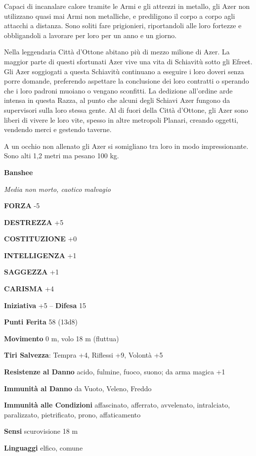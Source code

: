 \begin{multicols}{2}
	Capaci di incanalare calore tramite le Armi e gli attrezzi in metallo, gli Azer non utilizzano quasi mai Armi non metalliche, e prediligono il corpo a corpo agli attacchi a distanza. Sono soliti fare prigionieri, riportandoli alle loro fortezze e obbligandoli a lavorare per loro per un anno e un giorno.

	Nella leggendaria Città d'Ottone abitano più di mezzo milione di Azer. La maggior parte di questi sfortunati Azer vive una vita di Schiavitù sotto gli Efreet. Gli Azer soggiogati a questa Schiavitù continuano a eseguire i loro doveri senza porre domande, preferendo aspettare la conclusione dei loro contratti o sperando che i loro padroni muoiano o vengano sconfitti. La dedizione all'ordine arde intensa in questa Razza, al punto che alcuni degli Schiavi Azer fungono da supervisori sulla loro stessa gente. Al di fuori della Città d'Ottone, gli Azer sono liberi di vivere le loro vite, spesso in altre metropoli Planari, creando oggetti, vendendo merci e gestendo taverne.

	A un occhio non allenato gli Azer si somigliano tra loro in modo impressionante. Sono alti 1,2 metri ma pesano 100 kg.

	\medskip{}\textbf{Banshee}

	\textit{Media non morto, caotico malvagio}

	\textbf{FORZA} -5

	\textbf{DESTREZZA} +5

	\textbf{COSTITUZIONE} +0

	\textbf{INTELLIGENZA} +1

	\textbf{SAGGEZZA} +1

	\textbf{CARISMA} +4

	\textbf{Iniziativa} +5 -- \textbf{Difesa} 15

	\textbf{Punti Ferita} 58 (13d8)

	\textbf{Movimento} 0 m, volo 18 m (fluttua)

	\textbf{Tiri Salvezza}: Tempra +4, Riflessi +9, Volontà +5

	\textbf{Resistenze al Danno} acido, fulmine, fuoco, suono; da arma magica +1

	\textbf{Immunità al Danno} da Vuoto, Veleno, Freddo

	\textbf{Immunità alle Condizioni} affascinato, afferrato, avvelenato, intralciato, paralizzato, pietrificato, prono, affaticamento

	\textbf{Sensi} scurovisione 18 m

	\textbf{Linguaggi} elfico, comune


\end{multicols}
